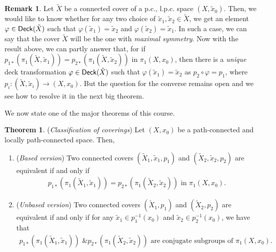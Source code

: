 \documentclass[letterpaper,11pt,twoside]{article}
\theoremstyle{definition}
\theoremstyle{definition}
\newtheorem{theorem}[proposition]{Theorem}
\theoremstyle{definition}
\newtheorem{remark}[proposition]{\textbf{Remark}}
\theoremstyle{definition}
\theoremstyle{definition}
\theoremstyle{definition}
\theoremstyle{remark}
\theoremstyle{definition}
\newcommand{\Deck}[1]{{\fontfamily{lmss}\selectfont 
		\text{Deck}(#1)
}}
\begin{document}
\begin{remark}
	Let $ \tilde{X} $ be a connected cover of a p.c., l.p.c. space $ (X,\tilde{x}_0) $. Then, we would like to know whether for any two choice of $ \tilde{x}_1,\tilde{x}_2\in \tilde{X} $, we get an element $ \varphi \in \Deck{\tilde{X}} $ such that $ \varphi(\tilde{x}_1) = \tilde{x}_2 $ and $ \varphi(\tilde{x}_2) = \tilde{x}_1 $. In such a case, we can say that the cover $ \tilde{X} $ will be the one with \textit{maximal symmetry}. Now with the result above, we can partly answer that, for if $ p_{1*}(\pi_1(\tilde{X},\tilde{x}_1)) =  p_{2*}(\pi_1(\tilde{X},\tilde{x}_2))$ in $ \pi_1(X,x_0) $, then there is a \textit{unique} deck transformation $ \varphi\in \Deck{\tilde{X}} $ such that $ \varphi(\tilde{x}_1) = \tilde{x}_2 $ as $ p_2\circ \varphi = p_1 $, where $ p_i : (\tilde{X},\tilde{x}_i)\to (X,x_0) $. But the question for the converse remains open and we see how to resolve it in the next big theorem.
\end{remark}
We now state one of the major theorems of this course.
\begin{theorem}\label{T-6.1.10}(\textit{Classification of coverings}) Let $ (X,x_0) $ be a path-connected and locally path-connected space. Then,
	\begin{enumerate}
		\item {(\textit{Based version}) Two connected covers $ (\tilde{X}_1,\tilde{x}_1,p_1) $ and $ (\tilde{X}_2,\tilde{x}_2,p_2) $ are equivalent if and only if 
	\begin{align*}
		p_{1*}(\pi_1(\tilde{X}_1,\tilde{x}_1)) = p_{2*}(\pi_1(\tilde{X}_2,\tilde{x}_2)) \text{ in }\pi_1(X,x_0).
	\end{align*}	
	}
		\item {(\textit{Unbased version}) Two connected covers $ (\tilde{X}_1,p_1) $ and $ (\tilde{X}_2,p_2) $ are equivalent if and only if for any $ \tilde{x}_1\in p_1^{-1}(x_0) $ and $ \tilde{x}_2 \in p_2^{-1}(x_0) $, we have that
	\begin{align*}
			p_{1*}(\pi_1(\tilde{X}_1,\tilde{x}_1)) \text{ \& }p_{2*}(\pi_1(\tilde{X}_2,\tilde{x}_2)) \text{ are conjugate subgroups of }\pi_1(X,x_0).
	\end{align*}	
	}
	\end{enumerate}
\end{theorem}
\end{document}
